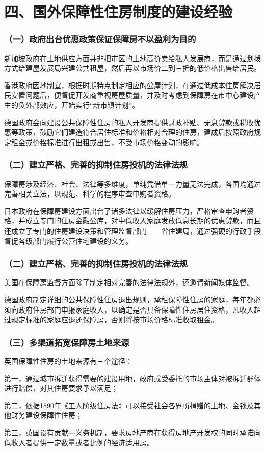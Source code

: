 \documentclass[aspectratio=169, 12pt]{beamer}
\begin{document}
\section{四、国外保障性住房制度的建设经验}

\begin{frame}[plain]
    \frametitle{（一）政府出台优惠政策保证保障房不以盈利为目的}
    新加坡政府在土地供应方面并非把市区的土地高价卖给私人发展商，而是通过划拨方式给建屋发展局兴建公共租屋，然后再以市场价二到三折的低价格出售给居民。
    \par
    香港政府因地制宜，根据时期特点制定相应的公屋计划，在通过低成本住房解决居民安置问题后，便督促开发商重视房屋质量，并及时考虑到保障房在市中心建设产生的负外部效应，开始实行“新市镇计划”。
    \par
    德国政府会向建设公共保障性住房的私人开发商提供财政补贴、无息贷款或税收优惠等政策，鼓励它们建造符合居住标准和价格相对合理的住房，建成后按照政府规定租金或价格标准进行出租或出售，不受市场价格变动的影响。
\end{frame}

\begin{frame}[plain]
    \frametitle{（二）建立严格、完善的抑制住房投机的法律法规}
    保障房涉及经济、社会、法律等多维度，单纯凭借单一力量无法完成，各国均通过完善相关立法，以规范、科学的程序审查申购者资格。
    \par
    日本政府在保障房建设方面出台了诸多法律以缓解住房压力，严格审查申购者资格，并成立专门的住房金融公库，对中低收入家庭发放低息长期的优惠贷款，而且还成立了专门的住房建设决策和管理监督部门——省住建局，通过强硬的行政手段督促各级部门履行公营住宅建设的义务。
\end{frame}

\begin{frame}[plain]
    \frametitle{（二）建立严格、完善的抑制住房投机的法律法规}
    美国在保障房监督方面除了制定相对完善的法律法规外，还邀请新闻媒体监督。
    \par
    德国政府制定详细的公共保障性住房退出规则，承租保障性住房的家庭，每年都必须向政府住房部门申报家庭收入，以确定是否具备保障性住房居住资格，凡收入超过规定标准的家庭应退还保障房，否则将按市场价格标准收取租金。
\end{frame}

\begin{frame}[plain]
    \frametitle{（三）多渠道拓宽保障房土地来源}
    英国保障性住房的土地来源有三个途径：
    \par
    第一，通过城市拆迁获得需要的建设用地，政府或受委托的市场主体对被拆迁群体进行赔偿，对其住房要求予以满足；
    \par
    第二，依据1890年《工人阶级住房法》可以接受社会各界所捐赠的土地、金钱及其他财务建设保障性住房；
    \par
    第三，英国设有贡献—义务机制，要求房地产商在获得房地产开发权的同时承诺向低收入者提供一定数量或者比例的经济适用房。
\end{frame}
\end{document}
